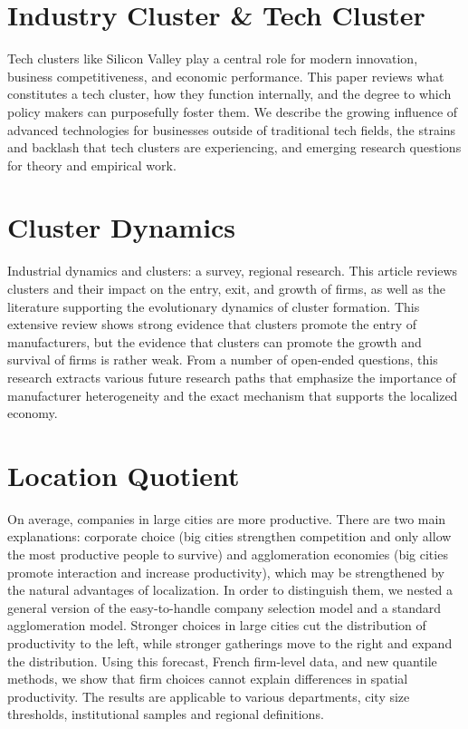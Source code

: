\documentclass[
  12pt,
  oneside]{book}
\begin{document}
\hypertarget{industry-cluster-tech-cluster}{%
\section{Industry Cluster \& Tech Cluster}\label{industry-cluster-tech-cluster}}

Tech clusters like Silicon Valley play a central role for modern innovation, business competitiveness, and economic performance. This paper reviews what constitutes a tech cluster, how they function internally, and the degree to which policy makers can purposefully foster them. We describe the growing influence of advanced technologies for businesses outside of traditional tech fields, the strains and backlash that tech clusters are experiencing, and emerging research questions for theory and empirical work.

\hypertarget{cluster-dynamics}{%
\section{Cluster Dynamics}\label{cluster-dynamics}}

Industrial dynamics and clusters: a survey, regional research. This article reviews clusters and their impact on the entry, exit, and growth of firms, as well as the literature supporting the evolutionary dynamics of cluster formation. This extensive review shows strong evidence that clusters promote the entry of manufacturers, but the evidence that clusters can promote the growth and survival of firms is rather weak. From a number of open-ended questions, this research extracts various future research paths that emphasize the importance of manufacturer heterogeneity and the exact mechanism that supports the localized economy.

\hypertarget{location-quotient}{%
\section{Location Quotient}\label{location-quotient}}

On average, companies in large cities are more productive. There are two main explanations: corporate choice (big cities strengthen competition and only allow the most productive people to survive) and agglomeration economies (big cities promote interaction and increase productivity), which may be strengthened by the natural advantages of localization. In order to distinguish them, we nested a general version of the easy-to-handle company selection model and a standard agglomeration model. Stronger choices in large cities cut the distribution of productivity to the left, while stronger gatherings move to the right and expand the distribution. Using this forecast, French firm-level data, and new quantile methods, we show that firm choices cannot explain differences in spatial productivity. The results are applicable to various departments, city size thresholds, institutional samples and regional definitions.
\end{document}
